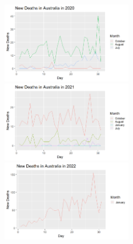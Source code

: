 \documentclass[a4paper]{article}
\theoremstyle{definition}
\begin{document}
\begin{enumerate}[i)]
\begin{enumerate}[1]
\begin{itemize}
     \begin{figure}[htp!]
    \includegraphics[width=0.5\textwidth]{Images/2.1v.png}
    \includegraphics[width=0.5\textwidth]{Images/2.2v.png}
    \includegraphics[width=0.5\textwidth]{Images/2.3v.png}
  \end{figure}
    \end{itemize}
    

\end{enumerate}
\end{enumerate}
\end{document}
